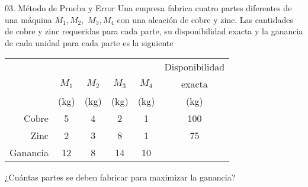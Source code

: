 \begin{frameExample}{03. Método de Prueba y Error}{}
  Una empresa fabrica cuatro partes diferentes de una máquina $M_1, M_2,$ $ M_3, M_4$ con una aleación de cobre y zinc. Las cantidades de cobre y zinc requeridas para cada parte, su \alert{disponibilidad exacta} y la ganancia de cada unidad para cada parte es la siguiente

  {\centering
    \begin{tabular}{rccccc}
      \toprule
      &&&&&Disponibilidad\\
      &$M_1$&$M_2$&$M_3$&$M_4$&exacta\\
      &(kg)&(kg)&(kg)&(kg)&(kg)\\
      \midrule
      Cobre&5&4&2&1&100\\
      Zinc&2&3&8&1&75\\
      Ganancia&12&8&14&10&\\
      \bottomrule
    \end{tabular}
  \par}

¿Cuántas partes se deben fabricar para maximizar la ganancia?
\end{frameExample}

